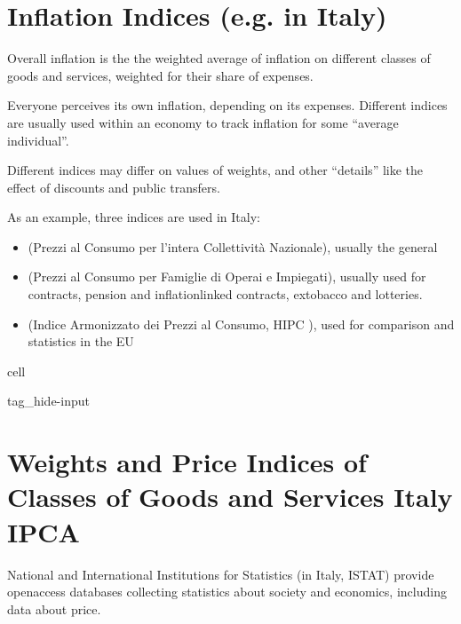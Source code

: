 \documentclass[letterpaper,10pt,english]{jupyterBook}
\begin{document}
\section{Inflation Indices (e.g. in Italy)}
\label{\detokenize{code/notebooks/inflation:inflation-indices-e-g-in-italy}}\label{\detokenize{code/notebooks/inflation:fin-edu-inflation-indices}}
\sphinxAtStartPar
Overall inflation is the the weighted average of inflation on different classes of goods and services, weighted for their share of expenses.

\sphinxAtStartPar
Everyone perceives its own inflation, depending on its expenses. Different indices are usually used within an economy to track inflation for some “average individual”.

\sphinxAtStartPar
Different indices may differ on values of weights, and other “details” like the effect of discounts and public transfers.

\sphinxAtStartPar
As an example, three indices are used in Italy:
\begin{itemize}
\item {} 
\sphinxAtStartPar
{} (Prezzi al Consumo per l’intera Collettività Nazionale), usually the general

\item {} 
\sphinxAtStartPar
{} (Prezzi al Consumo per Famiglie di Operai e Impiegati), usually used for contracts, pension and inflation\sphinxhyphen{}linked contracts, ex\sphinxhyphen{}tobacco and lotteries.

\item {} 
\sphinxAtStartPar
{} (Indice Armonizzato dei Prezzi al Consumo, HIPC ), used for comparison and statistics in the EU

\end{itemize}

\begin{sphinxuseclass}{cell}
\begin{sphinxuseclass}{tag_hide-input}
\end{sphinxuseclass}
\end{sphinxuseclass}

\section{Weights and Price Indices of Classes of Goods and Services \sphinxhyphen{} Italy IPCA}
\label{\detokenize{code/notebooks/inflation:weights-and-price-indices-of-classes-of-goods-and-services-italy-ipca}}\label{\detokenize{code/notebooks/inflation:fin-edu-inflation-ipca}}
\sphinxAtStartPar
National and International Institutions for Statistics (in Italy, ISTAT) provide open\sphinxhyphen{}access databases collecting statistics about society and economics, including data about price.
\end{document}
